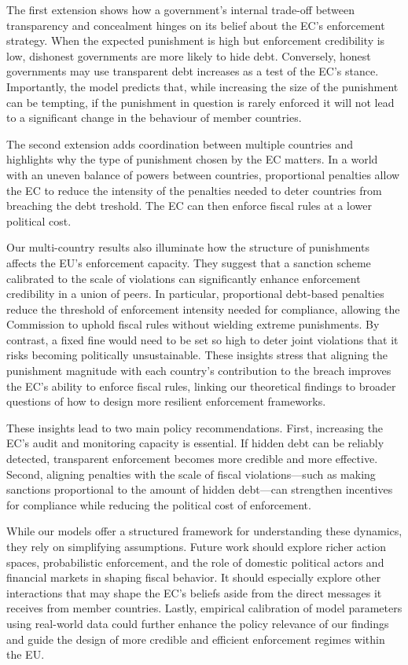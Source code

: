 \documentclass{article}
\begin{document}
The first extension shows how a government's internal trade-off between transparency and concealment hinges on its belief about the EC's enforcement strategy. When the expected punishment is high but enforcement credibility is low, dishonest governments are more likely to hide debt. Conversely, honest governments may use transparent debt increases as a test of the EC’s stance. Importantly, the model predicts that, while increasing the size of the punishment can be tempting, if the punishment in question is rarely enforced it will not lead to a significant change in the behaviour of member countries. 

The second extension adds coordination between multiple countries and highlights why the type of punishment chosen by the EC matters. In a world with an uneven balance of powers between countries, proportional penalties allow the EC to reduce the intensity of the penalties needed to deter countries from breaching the debt treshold. The EC can then enforce fiscal rules at a lower political cost.

Our multi-country results also illuminate how the structure of punishments affects the EU’s enforcement capacity. They suggest that a sanction scheme calibrated to the scale of violations can significantly enhance enforcement credibility in a union of peers. In particular, proportional debt-based penalties reduce the threshold of enforcement intensity needed for compliance, allowing the Commission to uphold fiscal rules without wielding extreme punishments. By contrast, a fixed fine would need to be set so high to deter joint violations that it risks becoming politically unsustainable. These insights stress that aligning the punishment magnitude with each country’s contribution to the breach improves the EC’s ability to enforce fiscal rules, linking our theoretical findings to broader questions of how to design more resilient enforcement frameworks.

These insights lead to two main policy recommendations. First, increasing the EC’s audit and monitoring capacity is essential. If hidden debt can be reliably detected, transparent enforcement becomes more credible and more effective. Second, aligning penalties with the scale of fiscal violations—such as making sanctions proportional to the amount of hidden debt—can strengthen incentives for compliance while reducing the political cost of enforcement.

While our models offer a structured framework for understanding these dynamics, they rely on simplifying assumptions. Future work should explore richer action spaces, probabilistic enforcement, and the role of domestic political actors and financial markets in shaping fiscal behavior. It should especially explore other interactions that may shape the EC’s beliefs aside from the direct messages it receives from member countries. Lastly, empirical calibration of model parameters using real-world data could further enhance the policy relevance of our findings and guide the design of more credible and efficient enforcement regimes within the EU.
\end{document}
